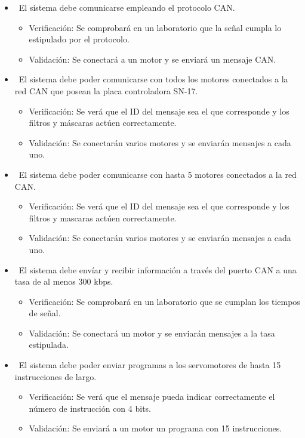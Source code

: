 \documentclass[
11pt, %
]{charter}
\begin{document}
\setcounter{REQ}{0}
\begin{itemize} 
	\item \REQ ~El sistema debe comunicarse empleando el protocolo CAN.
	\begin{itemize}
		\item Verificación: Se comprobará en un laboratorio que la señal cumpla lo estipulado por el protocolo.
		\item Validación: Se conectará a un motor y se enviará un mensaje CAN.
	\end{itemize}
	\item \REQ ~El sistema debe poder comunicarse con todos los motores conectados a la red CAN que posean la placa controladora SN-17.
	\begin{itemize}
		\item Verificación: Se verá que el ID del mensaje sea el que corresponde y los filtros y máscaras actúen correctamente.
		\item Validación: Se conectarán varios motores y se enviarán mensajes a cada uno.
	\end{itemize}
	\item \REQ ~El sistema debe poder comunicarse con hasta 5 motores conectados a la red CAN.
	\begin{itemize}
		\item Verificación: Se verá que el ID del mensaje sea el que corresponde y los filtros y mascaras actúen correctamente.
		\item Validación: Se conectarán varios motores y se enviarán mensajes a cada uno.
	\end{itemize}
	\item \REQ ~El sistema debe envíar y recibir información a través del puerto CAN a una tasa de al menos 300 kbps.
	\begin{itemize}
		\item Verificación: Se comprobará en un laboratorio que se cumplan los tiempos de señal.
		\item Validación: Se conectará un motor y se enviarán mensajes a la tasa estipulada.
	\end{itemize}
	\item \REQ ~El sistema debe poder enviar programas a los servomotores de hasta 15 instrucciones de largo.
	\begin{itemize}
		\item Verificación: Se verá que el mensaje pueda indicar correctamente el número de instrucción con 4 bits.
		\item Validación: Se enviará a un motor un programa con 15 instrucciones.

\end{itemize}
\end{itemize}
\end{document}
